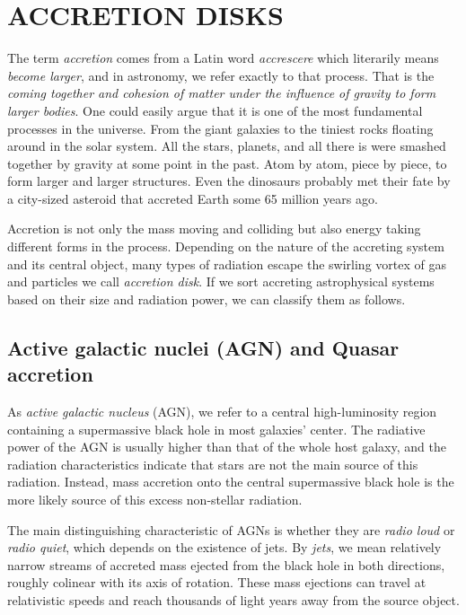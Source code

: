 \chapter{ACCRETION DISKS}

The term \emph{accretion} comes from a Latin word \emph{accrescere} which literarily means \emph{become larger}, and in astronomy, we refer exactly to that process. That is the \emph{coming together and cohesion of matter under the influence of gravity to form larger bodies}. One could easily argue that it is one of the most fundamental processes in the universe. From the giant galaxies to the tiniest rocks floating around in the solar system. All the stars, planets, and all there is were smashed together by gravity at some point in the past. Atom by atom, piece by piece, to form larger and larger structures. Even the dinosaurs probably met their fate by a city-sized asteroid that accreted Earth some 65 million years ago. 

Accretion is not only the mass moving and colliding but also energy taking different forms in the process. Depending on the nature of the accreting system and its central object, many types of radiation escape the swirling vortex of gas and particles we call \emph{accretion disk}. If we sort accreting astrophysical systems based on their size and radiation power, we can classify them as follows.  

\section{Active galactic nuclei (AGN) and Quasar accretion}

As \emph{active galactic nucleus} (AGN), we refer to a central high-luminosity region containing a supermassive black hole in most galaxies' center. The radiative power of the AGN is usually higher than that of the whole host galaxy, and the radiation characteristics indicate that stars are not the main source of this radiation. Instead, mass accretion onto the central supermassive black hole is the more likely source of this excess non-stellar radiation. 

The main distinguishing characteristic of AGNs is whether they are \emph{radio loud} or \emph{radio quiet}, which depends on the existence of jets. By \emph{jets}, we mean relatively narrow streams of accreted mass ejected from the black hole in both directions, roughly colinear with its axis of rotation. These mass ejections can travel at relativistic speeds and reach thousands of light years away from the source object. 


